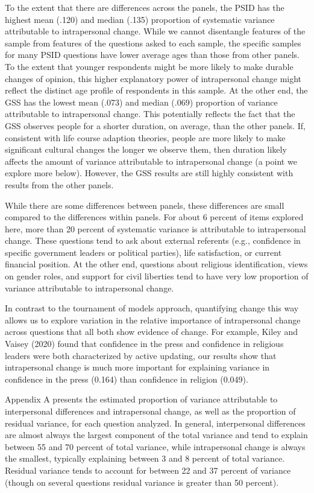 \documentclass[
  11pt,
]{article}
\begin{document}
To the extent that there are differences across the panels, the PSID has
the highest mean (.120) and median (.135) proportion of systematic
variance attributable to intrapersonal change. While we cannot
disentangle features of the sample from features of the questions asked
to each sample, the specific samples for many PSID questions have lower
average ages than those from other panels. To the extent that younger
respondents might be more likely to make durable changes of opinion,
this higher explanatory power of intrapersonal change might reflect the
distinct age profile of respondents in this sample. At the other end,
the GSS has the lowest mean (.073) and median (.069) proportion of
variance attributable to intrapersonal change. This potentially reflects
the fact that the GSS observes people for a shorter duration, on
average, than the other panels. If, consistent with life course adaption
theories, people are more likely to make significant cultural changes
the longer we observe them, then duration likely affects the amount of
variance attributable to intrapersonal change (a point we explore more
below). However, the GSS results are still highly consistent with
results from the other panels.

While there are some differences between panels, these differences are
small compared to the differences within panels. For about 6 percent of
items explored here, more than 20 percent of systematic variance is
attributable to intrapersonal change. These questions tend to ask about
external referents (e.g., confidence in specific government leaders or
political parties), life satisfaction, or current financial position. At
the other end, questions about religious identification, views on gender
roles, and support for civil liberties tend to have very low proportion
of variance attributable to intrapersonal change.

In contrast to the tournament of models approach, quantifying change
this way allows us to explore variation in the relative importance of
intrapersonal change across questions that all both show evidence of
change. For example, Kiley and Vaisey (2020) found that confidence in
the press and confidence in religious leaders were both characterized by
active updating, our results show that intrapersonal change is much more
important for explaining variance in confidence in the press (0.164)
than confidence in religion (0.049).

Appendix A presents the estimated proportion of variance attributable to
interpersonal differences and intrapersonal change, as well as the
proportion of residual variance, for each question analyzed. In general,
interpersonal differences are almost always the largest component of the
total variance and tend to explain between 55 and 70 percent of total
variance, while intrapersonal change is always the smallest, typically
explaining between 3 and 8 percent of total variance. Residual variance
tends to account for between 22 and 37 percent of variance (though on
several questions residual variance is greater than 50 percent).
\end{document}
